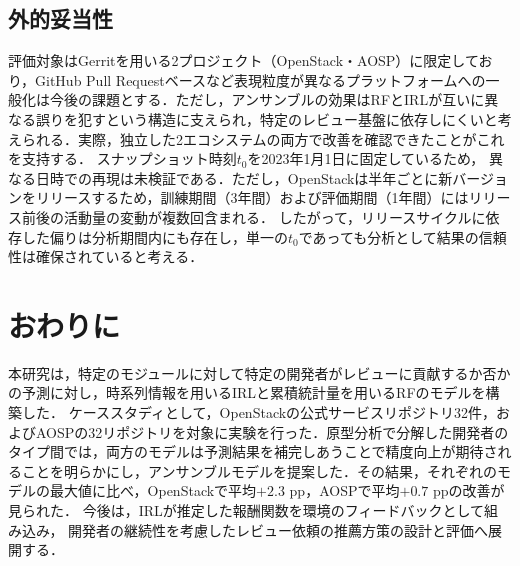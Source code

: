 \documentclass[submit]{ipsj}
\begin{document}
\subsection{外的妥当性}
評価対象はGerritを用いる2プロジェクト（OpenStack・AOSP）に限定しており，GitHub Pull Requestベースなど表現粒度が異なるプラットフォームへの一般化は今後の課題とする．ただし，アンサンブルの効果はRFとIRLが互いに異なる誤りを犯すという構造に支えられ，特定のレビュー基盤に依存しにくいと考えられる．実際，独立した2エコシステムの両方で改善を確認できたことがこれを支持する．
スナップショット時刻$t_0$を2023年1月1日に固定しているため，
異なる日時での再現は未検証である．ただし，OpenStackは半年ごとに新バージョンをリリースするため，訓練期間（3年間）および評価期間（1年間）にはリリース前後の活動量の変動が複数回含まれる．
したがって，リリースサイクルに依存した偏りは分析期間内にも存在し，単一の$t_0$であっても分析として結果の信頼性は確保されていると考える．

\section{おわりに}\label{sec:conclusion}
本研究は，特定のモジュールに対して特定の開発者がレビューに貢献するか否かの予測に対し，時系列情報を用いるIRLと累積統計量を用いるRFのモデルを構築した．
ケーススタディとして，OpenStackの公式サービスリポジトリ32件，およびAOSPの32リポジトリを対象に実験を行った．原型分析で分解した開発者のタイプ間では，両方のモデルは予測結果を補完しあうことで精度向上が期待されることを明らかにし，アンサンブルモデルを提案した．その結果，それぞれのモデルの最大値に比べ，OpenStackで平均$+2.3$ pp，AOSPで平均$+0.7$ ppの改善が見られた．
今後は，IRLが推定した報酬関数を環境のフィードバックとして組み込み，
開発者の継続性を考慮したレビュー依頼の推薦方策の設計と評価へ展開する．


\end{document}
